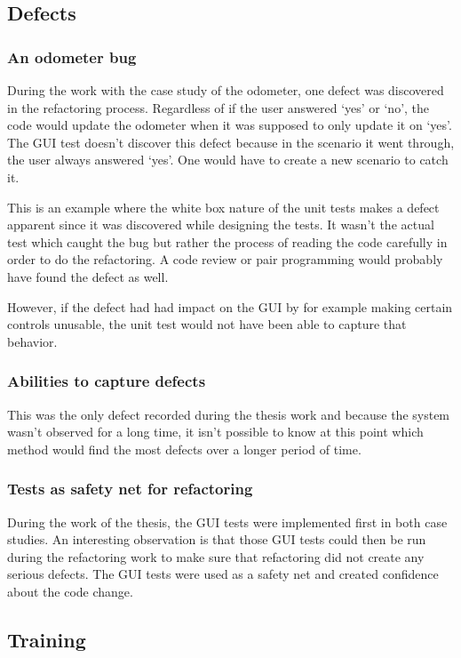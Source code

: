 \documentclass{article}
\begin{document}
		\subsection{Defects}	
			\subsubsection{An odometer bug}
			During the work with the case study of the odometer, one defect was discovered in the refactoring process. Regardless of if the user answered `yes' or `no', the code would update the odometer when it was supposed to only update it on `yes'. The GUI test doesn't discover this defect because in the scenario it went through, the user always answered `yes'. One would have to create a new scenario to catch it. 

			This is an example where the white box nature of the unit tests makes a defect apparent since it was discovered while designing the tests. It wasn't the actual test which caught the bug but rather the process of reading the code carefully in order to do the refactoring. A code review or pair programming would probably have found the defect as well. 

			However, if the defect had had impact on the GUI by for example making certain controls unusable, the unit test would not have been able to capture that behavior.

			\subsubsection{Abilities to capture defects}
			This was the only defect recorded during the thesis work and because the system wasn't observed for a long time, it isn't possible to know at this point which method would find the most defects over a longer period of time. 

			\subsubsection{Tests as safety net for refactoring}
			During the work of the thesis, the GUI tests were implemented first in both case studies. An interesting observation is that those GUI tests could then be run during the refactoring work to make sure that refactoring did not create any serious defects. The GUI tests were used as a safety net and created confidence about the code change. 

		\subsection{Training}
\end{document}
